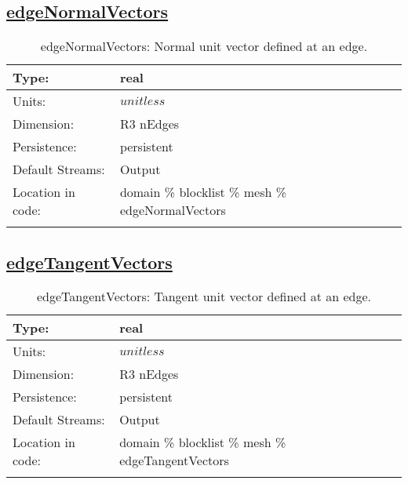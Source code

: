 \subsection[edgeNormalVectors]{\hyperref[sec:var_tab_mesh]{edgeNormalVectors}}
\label{subsec:var_sec_mesh_edgeNormalVectors}
\begin{center}
\begin{longtable}{| p{2.0in} | p{4.0in} |}
        \hline 
        Type: & real \\
        \hline 
        Units: & $unitless$ \\
        \hline 
        Dimension: & R3 nEdges \\
        \hline 
        Persistence: & persistent \\
        \hline 
		 Default Streams: & Output  \\
        \hline 
		 Location in code: & domain \% blocklist \% mesh \% edgeNormalVectors \\
		 \hline 
    \caption{edgeNormalVectors: Normal unit vector defined at an edge.}
\end{longtable}
\end{center}
\subsection[edgeTangentVectors]{\hyperref[sec:var_tab_mesh]{edgeTangentVectors}}
\label{subsec:var_sec_mesh_edgeTangentVectors}
\begin{center}
\begin{longtable}{| p{2.0in} | p{4.0in} |}
        \hline 
        Type: & real \\
        \hline 
        Units: & $unitless$ \\
        \hline 
        Dimension: & R3 nEdges \\
        \hline 
        Persistence: & persistent \\
        \hline 
		 Default Streams: & Output  \\
        \hline 
		 Location in code: & domain \% blocklist \% mesh \% edgeTangentVectors \\
		 \hline 
    \caption{edgeTangentVectors: Tangent unit vector defined at an edge.}
\end{longtable}
\end{center}
